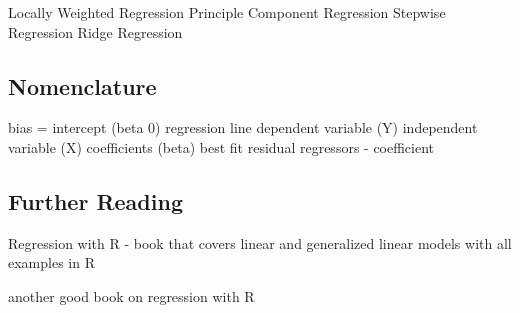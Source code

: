 \begin{bibunit}
Locally Weighted Regression
Principle Component Regression
Stepwise Regression
Ridge Regression


\subsection{Nomenclature}

bias = intercept (beta 0)
regression line
dependent variable (Y)
independent variable (X)
coefficients (beta)
best fit
residual
regressors - coefficient


\subsection{Further Reading}


Regression with R - book that covers linear and generalized linear models with all examples in R \cite{Weisberg2010}

another good book on regression with R \cite{Sheather2009}



\putbib
\end{bibunit}

\newpage\begin{bibunit}\putbib\end{bibunit}
\newpage\begin{bibunit}\putbib\end{bibunit}
\newpage\begin{bibunit}\putbib\end{bibunit}
\newpage\begin{bibunit}\putbib\end{bibunit}
\newpage\begin{bibunit}\putbib\end{bibunit}

